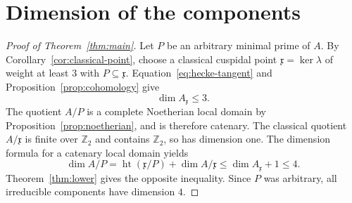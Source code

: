 \documentclass[11pt]{article}
\theoremstyle{remark}
\numberwithin{equation}{section}
\newcommand{\Z}{\mathbb Z}
\newcommand{\frakx}{\mathfrak x}
\DeclareMathOperator{\height}{ht}
\begin{document}
\section{Dimension of the components}
\label{sec:conclusion}

\begin{proof}[Proof of Theorem~\ref{thm:main}]
Let $P$ be an arbitrary minimal prime of $A$. By
Corollary~\ref{cor:classical-point}, choose a classical cuspidal
point $\frakx=\ker\lambda$ of weight at least $3$ with
$P\subseteq\frakx$. Equation~\eqref{eq:hecke-tangent} and
Proposition~\ref{prop:cohomology} give
\[
 \dim A_{\frakx}\leq3.
\]
The quotient $A/P$ is a complete Noetherian local domain by
Proposition~\ref{prop:noetherian}, and is therefore catenary.
The classical quotient $A/\frakx$ is finite over $\Z_2$ and
contains $\Z_2$, so has dimension one. The dimension formula for
a catenary local domain yields
\[
 \dim A/P
 =\height(\frakx/P)+\dim A/\frakx
 \leq\dim A_{\frakx}+1
 \leq4.
\]
Theorem~\ref{thm:lower} gives the opposite inequality. Since $P$
was arbitrary, all irreducible components have dimension $4$.
\end{proof}



\end{document}
